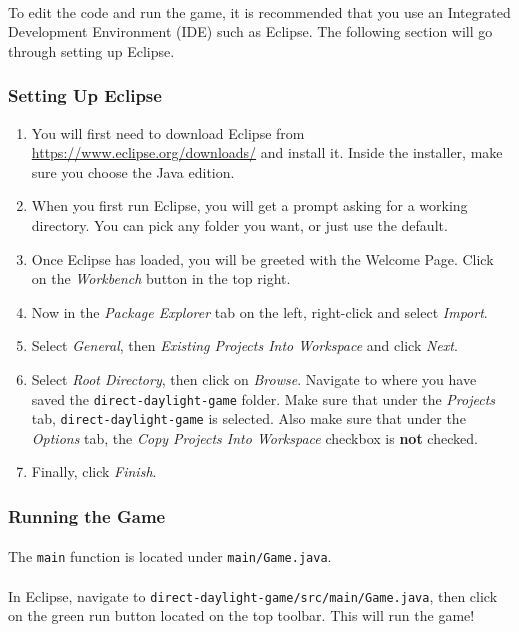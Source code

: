 \documentclass[11pt]{article}
\begin{document}
\paragraph{}
To edit the code and run the game, it is recommended that you use an Integrated Development Environment (IDE) such as Eclipse. The following section will go through setting up Eclipse.
\subsubsection{Setting Up Eclipse}
\begin{enumerate}
\item You will first need to download Eclipse from \url{https://www.eclipse.org/downloads/} and install it. Inside the installer, make sure you choose the Java edition.
\item When you first run Eclipse, you will get a prompt asking for a working directory. You can pick any folder you want, or just use the default.
\item Once Eclipse has loaded, you will be greeted with the Welcome Page. Click on the \textit{Workbench} button in the top right.
\item Now in the \textit{Package Explorer} tab on the left, right-click and select \textit{Import}.
\item Select \textit{General}, then \textit{Existing Projects Into Workspace} and click \textit{Next}.
\item Select \textit{Root Directory}, then click on \textit{Browse}. Navigate to where you have saved the \lstinline{direct-daylight-game} folder. Make sure that under the \textit{Projects} tab, \lstinline{direct-daylight-game} is selected. Also make sure that under the \textit{Options} tab, the \textit{Copy Projects Into Workspace} checkbox is \textbf{not} checked. 
\item Finally, click \textit{Finish}.
\end{enumerate}
\subsubsection{Running the Game}
\paragraph{}
The \lstinline{main} function is located under \lstinline{main/Game.java}. 
\paragraph{}
In Eclipse, navigate to \lstinline{direct-daylight-game/src/main/Game.java}, then click on the green run button located on the top toolbar. This will run the game!
\end{document}
